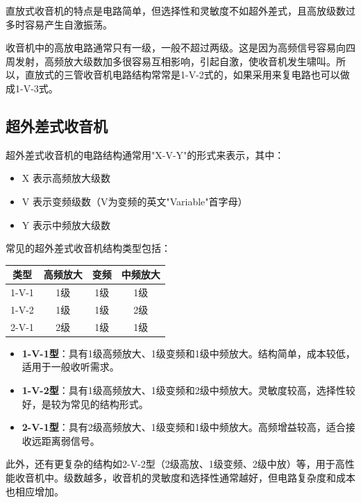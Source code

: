 \documentclass[12pt,UTF8]{ctexbook}
\begin{document}
直放式收音机的特点是电路简单，但选择性和灵敏度不如超外差式，且高放级数过多时容易产生自激振荡。

收音机中的高放电路通常只有一级，一般不超过两级。这是因为高频信号容易向四周发射，高频放大级数加多很容易互相影响，引起自激，使收音机发生啸叫。所以，直放式的三管收音机电路结构常常是1-V-2式的，如果采用来复电路也可以做成1-V-3式。

\subsection{超外差式收音机}

超外差式收音机的电路结构通常用"X-V-Y"的形式来表示，其中：
\begin{itemize}[leftmargin=3.5em]
    \item X 表示高频放大级数
    \item V 表示变频级数（V为变频的英文"Variable"首字母）
    \item Y 表示中频放大级数
\end{itemize}

常见的超外差式收音机结构类型包括：

\begin{center}
\begin{tabular}{|c|c|c|c|}
\hline
\textbf{类型} & \textbf{高频放大} & \textbf{变频} & \textbf{中频放大} \\
\hline
1-V-1 & 1级 & 1级 & 1级 \\
\hline
1-V-2 & 1级 & 1级 & 2级 \\
\hline
2-V-1 & 2级 & 1级 & 1级 \\
\hline
\end{tabular}
\end{center}

\begin{itemize}[leftmargin=3.5em]
    \item \textbf{1-V-1型}：具有1级高频放大、1级变频和1级中频放大。结构简单，成本较低，适用于一般收听需求。
    \item \textbf{1-V-2型}：具有1级高频放大、1级变频和2级中频放大。灵敏度较高，选择性较好，是较为常见的结构形式。
    \item \textbf{2-V-1型}：具有2级高频放大、1级变频和1级中频放大。高频增益较高，适合接收远距离弱信号。
\end{itemize}

此外，还有更复杂的结构如2-V-2型（2级高放、1级变频、2级中放）等，用于高性能收音机中。级数越多，收音机的灵敏度和选择性通常越好，但电路复杂度和成本也相应增加。
\end{document}
